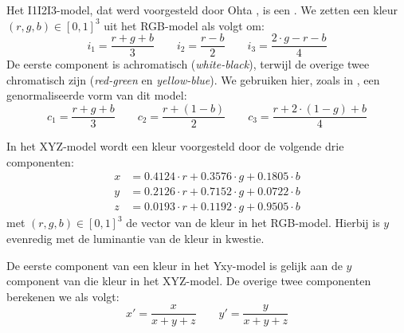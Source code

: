 Het I1I2I3-model, dat werd voorgesteld door Ohta 
\cite{ohta:color_info_for_region_segm}, is een . 
We zetten een kleur $(r,g,b) \in 
[0,1]^3$ uit het RGB-model als volgt om:
\begin{displaymath}
i_1 = \frac{r+g+b}{3} \qquad i_2 = \frac{r-b}{2} \qquad i_3 = \frac{2 \cdot g - 
r - b}{4}
\end{displaymath}
De eerste component is achromatisch (\emph{white-black}), terwijl de overige 
twee chromatisch zijn (\emph{red-green} en \emph{yellow-blue}).
We gebruiken hier, zoals in \cite{wang:cbir_using_daubechies_wavelets}, een 
genormaliseerde vorm van dit model:
\begin{displaymath}
c_1 = \frac{r+g+b}{3} \qquad c_2 = \frac{r + (1 - b)}{2} \qquad c_3 = \frac{r + 
2 \cdot (1 - g) + b}{4}
\end{displaymath}

In het XYZ-model wordt een kleur voorgesteld door de volgende drie componenten: 
\begin{align*}
x & = 0.4124 \cdot r + 0.3576 \cdot g + 0.1805 \cdot b \\
y & = 0.2126 \cdot r + 0.7152 \cdot g + 0.0722 \cdot b \\
z & = 0.0193 \cdot r + 0.1192 \cdot g + 0.9505 \cdot b
\end{align*}
met $(r,g,b) \in [0,1]^3$ de vector van de kleur in het RGB-model. Hierbij 
is $y$ evenredig met de luminantie van de kleur in kwestie. 

De eerste component van een kleur in het Yxy-model is gelijk aan de $y$ 
component van die kleur in het XYZ-model. De overige twee componenten berekenen 
we als volgt:
\begin{displaymath}
x' = \frac{x}{x+y+z} \qquad y' = \frac{y}{x+y+z}
\end{displaymath}

